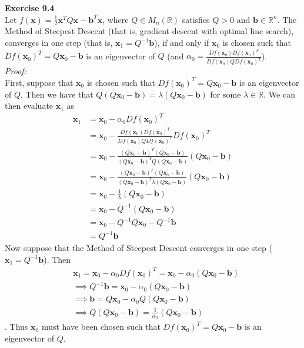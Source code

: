 \documentclass[letterpaper,12pt]{article}
\let\vec\mathbf
\theoremstyle{definition}
\begin{document}
\textbf{Exercise 9.4} \\
Let $f(\vec{x}) = \frac{1}{2}\vec{x}^TQ\vec{x} - \vec{b}^T\vec{x}$, where $Q \in M_n(\mathbb{R})$ satisfies $Q>0$ and $\vec{b} \in \mathbb{R}^n$. The Method of Steepest Descent (that is, gradient descent with optimal line search), converges in one step (that is, $\vec{x}_1 = Q^{-1}\vec{b}$), if and only if $\vec{x}_0$ is chosen such that $Df(\vec{x}_0)^T = Q\vec{x}_0 - \vec{b}$ is an eigenvector of $Q$ \big(and $\alpha_0 = \frac{Df(\vec{x}_0)Df(\vec{x}_0)^T}{Df(\vec{x}_0)QDf(\vec{x}_0)^T}$\big). \\
\textit{Proof:} \\
First, suppose that $\vec{x}_0$ is chosen such that $Df(\vec{x}_0)^T = Q\vec{x}_0 - \vec{b}$ is an eigenvector of $Q$. Then we have that $Q(Q\vec{x}_0 - \vec{b}) = \lambda(Q\vec{x}_0 - \vec{b})$ for some $\lambda \in \mathbb{R}$. We can then evaluate $\vec{x}_1$ as\\
\begin{align*}
  \vec{x}_1 &= \vec{x}_0 - \alpha_0 Df(\vec{x}_0)^T
  \\
  &= \vec{x}_0 - \frac{Df(\vec{x}_0)Df(\vec{x}_0)^T}{Df(\vec{x}_0)QDf(\vec{x}_0)^T} Df(\vec{x}_0)^T
  \\
  &= \vec{x}_0 - \frac{(Q\vec{x}_0 - \vec{b})^T(Q\vec{x}_0 - \vec{b})}{(Q\vec{x}_0 - \vec{b})^TQ(Q\vec{x}_0 - \vec{b})} (Q\vec{x}_0 - \vec{b})
  \\
  &= \vec{x}_0 - \frac{(Q\vec{x}_0 - \vec{b})^T(Q\vec{x}_0 - \vec{b})}{(Q\vec{x}_0 - \vec{b})^T\lambda(Q\vec{x}_0 - \vec{b})} (Q\vec{x}_0 - \vec{b})
  \\
  &= \vec{x}_0 - \frac{1}{\lambda}(Q\vec{x}_0 - \vec{b})
  \\
  &= \vec{x}_0 - Q^{-1}(Q\vec{x}_0 - \vec{b})
  \\
  &= \vec{x}_0 - Q^{-1}Q\vec{x}_0 - Q^{-1}\vec{b}
  \\
  &= Q^{-1}\vec{b}
\end{align*}
Now suppose that the Method of Steepest Descent converges in one step ($\vec{x}_1 = Q^{-1}\vec{b}$). Then
\begin{align*}
  &\vec{x}_1 = \vec{x}_0 - \alpha_0 Df(\vec{x}_0)^T = \vec{x}_0 - \alpha_0 (Q\vec{x}_0 - \vec{b})
  \\
  &\implies Q^{-1}\vec{b} = \vec{x}_0 - \alpha_0 (Q\vec{x}_0 - \vec{b})
  \\
  &\implies \vec{b} = Q\vec{x}_0 - \alpha_0 Q(Q\vec{x}_0 - \vec{b})
  \\
  &\implies Q(Q\vec{x}_0 - \vec{b}) = \frac{1}{\alpha_0}(Q\vec{x}_0 - \vec{b})
\end{align*}.
Thus $\vec{x}_0$ must have been chosen such that $Df(\vec{x}_0)^T = Q\vec{x}_0 - \vec{b}$ is an eigenvector of $Q$. \\
\end{document}
